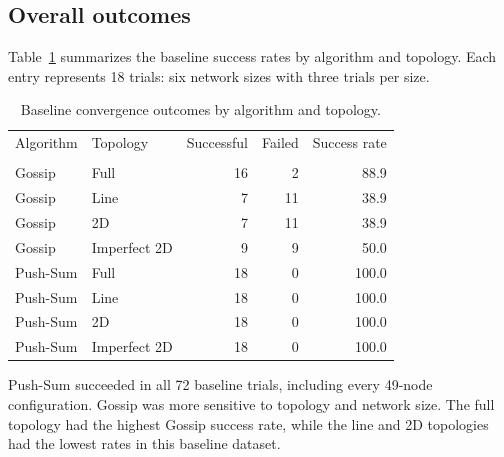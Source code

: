 \documentclass[11pt]{article}
\begin{document}
\subsection{Overall outcomes}
Table~\ref{tab:baseline} summarizes the baseline success rates by
algorithm and topology. Each entry represents 18 trials:
six network sizes with three trials per size.
\par
\begin{table}[H]
\centering
\caption{Baseline convergence outcomes by algorithm and topology.}
\label{tab:baseline}
\begin{tabular}{llrrr}
\toprule
Algorithm & Topology & Successful & Failed & Success rate \\\\
\midrule
Gossip & Full & 16 & 2 & 88.9\\%
Gossip & Line & 7 & 11 & 38.9\\%
Gossip & 2D & 7 & 11 & 38.9\\%
Gossip & Imperfect 2D & 9 & 9 & 50.0\\%
\midrule
Push-Sum & Full & 18 & 0 & 100.0\\%
Push-Sum & Line & 18 & 0 & 100.0\\%
Push-Sum & 2D & 18 & 0 & 100.0\\%
Push-Sum & Imperfect 2D & 18 & 0 & 100.0\\%
\bottomrule
\end{tabular}
\end{table}
Push-Sum succeeded in all 72 baseline trials, including every
49-node configuration. Gossip was more sensitive to topology and
network size. The full topology had the highest Gossip success rate,
while the line and 2D topologies had the lowest rates in this
baseline dataset.
\par
\end{document}
